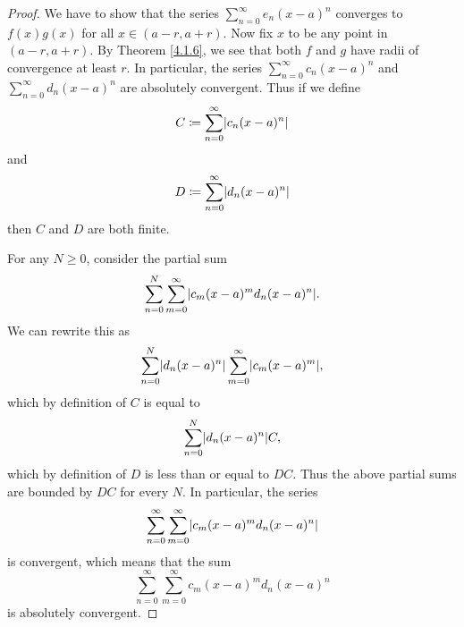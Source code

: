 \begin{proof}
    We have to show that the series \(\sum_{n = 0}^\infty e_n (x - a)^n\) converges to \(f(x) g(x)\) for all \(x \in (a - r, a + r)\).
    Now fix \(x\) to be any point in \((a - r, a + r)\).
    By Theorem \ref{4.1.6}, we see that both \(f\) and \(g\) have radii of convergence at least \(r\).
    In particular, the series \(\sum_{n = 0}^\infty c_n (x - a)^n\) and \(\sum_{n = 0}^\infty d_n (x - a)^n\) are absolutely convergent.
    Thus if we define
    \[
        C \coloneqq \sum_{n = 0}^\infty \abs*{c_n (x - a)^n}
    \]
    and
    \[
        D \coloneqq \sum_{n = 0}^\infty \abs*{d_n (x - a)^n}
    \]
    then \(C\) and \(D\) are both finite.

    For any \(N \geq 0\), consider the partial sum
    \[
        \sum_{n = 0}^N \sum_{m = 0}^\infty \abs*{c_m (x - a)^m d_n (x - a)^n}.
    \]
    We can rewrite this as
    \[
        \sum_{n = 0}^N \abs*{d_n (x - a)^n} \sum_{m = 0}^\infty \abs*{c_m (x - a)^m},
    \]
    which by definition of \(C\) is equal to
    \[
        \sum_{n = 0}^N \abs*{d_n (x - a)^n} C,
    \]
    which by definition of \(D\) is less than or equal to \(DC\).
    Thus the above partial sums are bounded by \(DC\) for every \(N\).
    In particular, the series
    \[
        \sum_{n = 0}^\infty \sum_{m = 0}^\infty \abs*{c_m (x - a)^m d_n (x - a)^n}
    \]
    is convergent, which means that the sum
    \[
        \sum_{n = 0}^\infty \sum_{m = 0}^\infty c_m (x - a)^m d_n (x - a)^n
    \]
    is absolutely convergent.


\end{proof}
